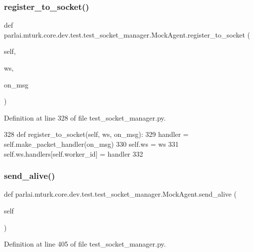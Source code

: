 \subsubsection{\texorpdfstring{register\+\_\+to\+\_\+socket()}{register\_to\_socket()}}
{\footnotesize\ttfamily def parlai.\+mturk.\+core.\+dev.\+test.\+test\+\_\+socket\+\_\+manager.\+Mock\+Agent.\+register\+\_\+to\+\_\+socket (\begin{DoxyParamCaption}\item[{}]{self,  }\item[{}]{ws,  }\item[{}]{on\+\_\+msg }\end{DoxyParamCaption})}



Definition at line 328 of file test\+\_\+socket\+\_\+manager.\+py.


\begin{DoxyCode}
328     \textcolor{keyword}{def }register\_to\_socket(self, ws, on\_msg):
329         handler = self.make\_packet\_handler(on\_msg)
330         self.ws = ws
331         self.ws.handlers[self.worker\_id] = handler
332 
\end{DoxyCode}
\mbox{\label{classparlai_1_1mturk_1_1core_1_1dev_1_1test_1_1test__socket__manager_1_1MockAgent_aa6b3ec5ae40ee38cb6114ee0f6bba21e}} 
\subsubsection{\texorpdfstring{send\+\_\+alive()}{send\_alive()}}
{\footnotesize\ttfamily def parlai.\+mturk.\+core.\+dev.\+test.\+test\+\_\+socket\+\_\+manager.\+Mock\+Agent.\+send\+\_\+alive (\begin{DoxyParamCaption}\item[{}]{self }\end{DoxyParamCaption})}



Definition at line 405 of file test\+\_\+socket\+\_\+manager.\+py.



